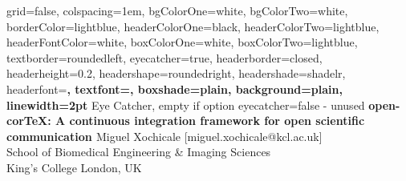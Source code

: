 \documentclass[a1paper,portrait]{baposter}
\begin{document}



\begin{poster}%
  {
  grid=false,
  colspacing=1em,
  bgColorOne=white,
  bgColorTwo=white,
  borderColor=lightblue,
  headerColorOne=black,
  headerColorTwo=lightblue,
  headerFontColor=white,
  boxColorOne=white,
  boxColorTwo=lightblue,
  textborder=roundedleft,
  eyecatcher=true,
  headerborder=closed,
  headerheight=0.2\textheight,
  headershape=roundedright,
  headershade=shadelr,
  headerfont=\Large \bf , %
  textfont={\setlength{\parindent}{0.2em}},
  boxshade=plain,
  background=plain,
  linewidth=2pt
  }
{
	Eye Catcher, empty if option eyecatcher=false - unused
}
{\bf
  {
	open-corTeX: A 
	continuous integration framework for 
	open scientific communication
  }
}
{
	{\smaller 
		Miguel Xochicale [miguel.xochicale@kcl.ac.uk] 
		} \\ 
	{\smaller
		School of Biomedical Engineering \& Imaging Sciences \\
		King's College London, UK 
	}
}
%     
%       



\end{poster}
\end{document}
